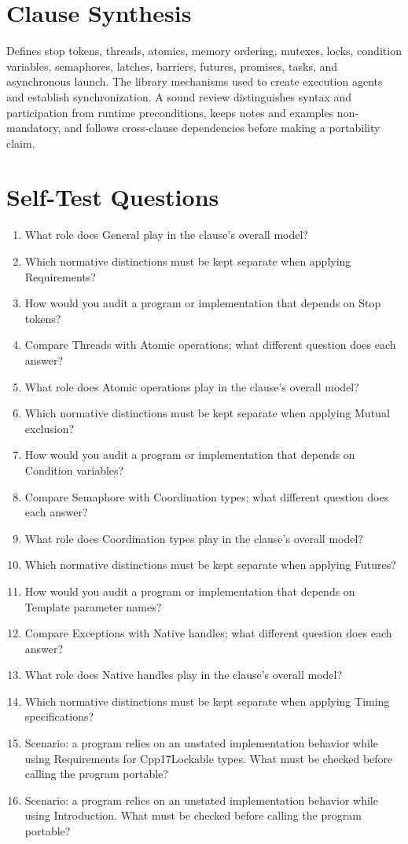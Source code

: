 \documentclass[11pt,letterpaper]{article}
\begin{document}
\section{Clause Synthesis}
\begin{CornellReferenceOrientationBox}Defines stop tokens, threads, atomics, memory ordering, mutexes, locks, condition variables, semaphores, latches, barriers, futures, promises, tasks, and asynchronous launch. The library mechanisms used to create execution agents and establish synchronization. A sound review distinguishes syntax and participation from runtime preconditions, keeps notes and examples non-mandatory, and follows cross-clause dependencies before making a portability claim.\end{CornellReferenceOrientationBox}
\section{Self-Test Questions}
\begin{enumerate}
\item What role does General play in the clause's overall model?
\item Which normative distinctions must be kept separate when applying Requirements?
\item How would you audit a program or implementation that depends on Stop tokens?
\item Compare Threads with Atomic operations; what different question does each answer?
\item What role does Atomic operations play in the clause's overall model?
\item Which normative distinctions must be kept separate when applying Mutual exclusion?
\item How would you audit a program or implementation that depends on Condition variables?
\item Compare Semaphore with Coordination types; what different question does each answer?
\item What role does Coordination types play in the clause's overall model?
\item Which normative distinctions must be kept separate when applying Futures?
\item How would you audit a program or implementation that depends on Template parameter names?
\item Compare Exceptions with Native handles; what different question does each answer?
\item What role does Native handles play in the clause's overall model?
\item Which normative distinctions must be kept separate when applying Timing specifications?
\item Scenario: a program relies on an unstated implementation behavior while using Requirements for Cpp17Lockable types. What must be checked before calling the program portable?
\item Scenario: a program relies on an unstated implementation behavior while using Introduction. What must be checked before calling the program portable?
\end{enumerate}
\end{document}
